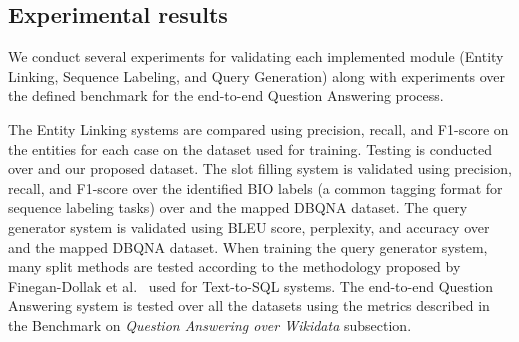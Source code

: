 \subsection*{Experimental results}
\label{cap1:intro/contributions/expResults}
We conduct several experiments for validating each implemented module (Entity Linking, 
Sequence Labeling, and Query Generation) along with experiments over the defined 
benchmark for the end-to-end Question Answering process.

The Entity Linking systems are compared using precision, recall, and F1-score on the 
entities for each case on the dataset used for training. Testing is conducted over \QALDseven{} and 
our proposed dataset. The slot filling system is validated using precision, recall, and F1-score 
over the identified BIO labels (a common tagging format for sequence labeling tasks) over 
\LCQuADtwo{} and the mapped DBQNA dataset. The query generator system is validated 
using BLEU score, perplexity, and accuracy over \LCQuADtwo{} and the mapped DBQNA 
dataset. When training the query generator system, many split methods are tested according 
to the methodology proposed by Finegan-Dollak et al.~\cite{semPar:txt-to-sql-RadevKZZFRS18} used for Text-to-SQL systems. 
The end-to-end Question Answering system is tested over all the datasets using the metrics 
described in the Benchmark on \textit{Question Answering over Wikidata} subsection.